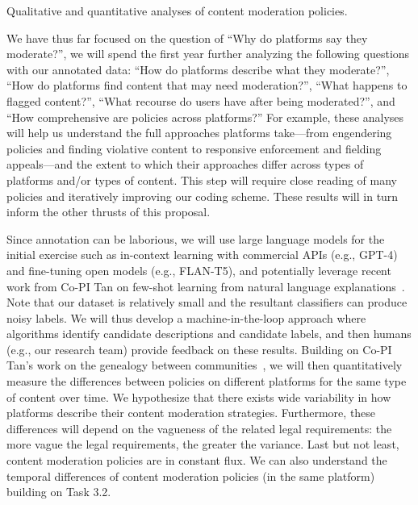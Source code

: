 \begin{task}
Qualitative and quantitative analyses of content moderation policies.
\end{task}

We have thus far focused on the question of ``Why do platforms say they moderate?'', we will spend the first year further analyzing the following questions with our annotated data: ``How do platforms describe what they moderate?'', ``How do platforms find content that may need moderation?'', ``What happens to flagged content?'', ``What recourse do users have after being moderated?'', and ``How comprehensive are policies across platforms?''
For example, these analyses will help us understand the full approaches platforms take---from engendering policies and finding violative content to responsive enforcement and fielding appeals---and the extent to which their approaches differ across types of platforms and/or types of content.
This step will require close reading of many policies and iteratively improving our coding scheme.
These results will in turn inform the other thrusts of this proposal.

Since annotation can be laborious, we will use large language models for the
initial exercise such as in-context learning with commercial APIs (e.g.,
GPT-4) and fine-tuning open models (e.g., FLAN-T5), and potentially leverage
recent work from Co-PI Tan on few-shot learning from natural language
explanations~\cite{zhou2023flame}.  Note that our dataset is relatively small
and the resultant classifiers can produce noisy labels.  We will thus develop
a machine-in-the-loop approach where algorithms identify candidate
descriptions and candidate labels, and then humans (e.g., our research team)
provide feedback on these results.  Building on Co-PI Tan’s work on the
genealogy between communities~\cite{tan:18}, we will then quantitatively
measure the differences between policies on different platforms for the same
type of content over time.  We hypothesize that there exists wide variability
in how platforms describe their content moderation strategies.  Furthermore,
these differences will depend on the vagueness of the related legal
requirements: the more vague the legal requirements, the greater the variance.
Last but not least, content moderation policies are in constant flux.  We can
also understand the temporal differences of content moderation policies (in
the same platform) building on Task 3.2.



